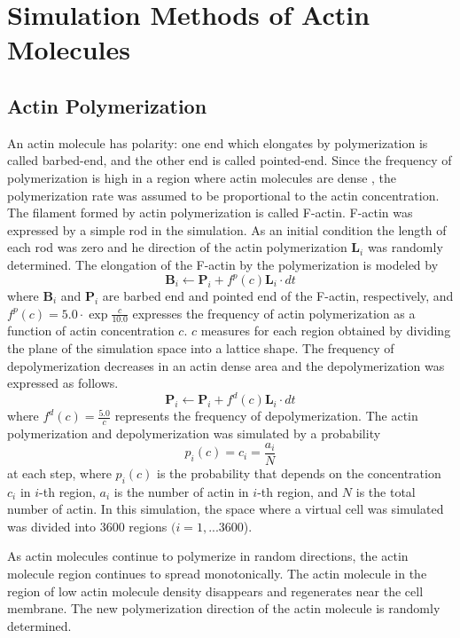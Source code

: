 \documentclass[a4paper,12pt, oneside]{book}
\begin{document}
\section{Simulation Methods of Actin Molecules}
\subsection{Actin Polymerization}
An actin molecule has polarity: one end which elongates by  polymerization is called barbed-end, and the other end is called pointed-end.
Since the frequency of polymerization is high in a region where actin molecules are dense \cite{svitkina1997analysis}, the polymerization rate was assumed to be  proportional to the actin concentration.
The filament formed by actin polymerization is called F-actin.
F-actin was expressed by a simple  rod in the simulation. 
As an initial condition the length of each rod was zero and he direction of the actin polymerization $\bm{L}_i$ was  randomly determined.
The elongation of the F-actin by the polymerization is modeled by
\begin{equation}
\bm{B}_i \gets \bm{P}_i + f^p(c)\bm{L}_i \cdot dt
\end{equation}
where $\bm{B}_i$ and $\bm{P}_i$ are barbed end and pointed end of the F-actin, respectively, and $f^p(c) = 5.0 \cdot \exp{\frac{c}{10.0}}$ expresses the frequency of actin polymerization as a function of actin concentration $c$.
$c$ measures for each region obtained by dividing the plane of the simulation space into a lattice shape.
The frequency of depolymerization decreases in an actin dense area and the depolymerization was expressed  as follows.
\begin{equation}
\bm{P}_i \gets \bm{P}_i + f^d(c)\bm{L}_i \cdot dt
\end{equation}
where $f^d(c) = \frac{5.0}{c}$ represents the frequency of depolymerization. 
The actin polymerization and depolymerization was simulated by a probability  \[p_i(c) = c_i = \frac{a_i}{N}\] at each step, where $p_i(c)$ is the probability that depends on the concentration $c_i$ in $i$-th region, $a_i$ is the number of actin in $i$-th region, and $N$ is the total number of actin.
In this simulation, the space where a virtual cell was simulated was divided into $3600$ regions $(i = 1,...3600$).

As actin molecules continue to polymerize in random directions, the actin molecule region continues to spread monotonically.
The actin molecule in the region of low actin molecule density disappears and regenerates near the cell membrane.
The new polymerization direction of the actin molecule is randomly determined.
\end{document}

